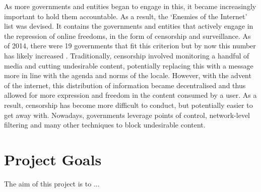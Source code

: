 As more governments and entities began to engage in this, it became increasingly important to hold them accountable. As a result, the ‘Enemies of the Internet’ list was devised. It contains the governments and entities that actively engage in the repression of online freedoms, in the form of censorship and surveillance. As of 2014, there were 19 governments that fit this criterion but by now this number has likely increased \cite{GlobalCensorshipRef2}. Traditionally, censorship involved monitoring a handful of media and cutting undesirable content, potentially replacing this with a message more in line with the agenda and norms of the locale. However, with the advent of the internet, this distribution of information became decentralised and thus allowed for more expression and freedom in the content consumed by a user. As a result, censorship has become more difficult to conduct, but potentially easier to get away with. Nowadays, governments leverage points of control, network-level filtering and many other techniques to block undesirable content.

\section{Project Goals}

The aim of this project is to ...


